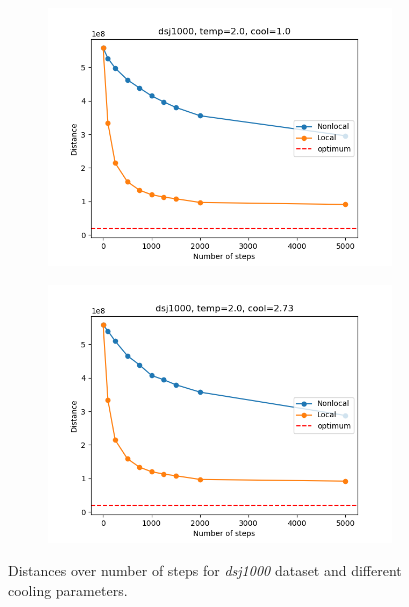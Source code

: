 \begin{figure}[!htb]
	\centering
	\begin{subfigure}{0.45\textwidth}
		\includegraphics[width=\textwidth]{img/dsj1000_temp=2.0_cool=1.0}
	\end{subfigure}
	\begin{subfigure}{0.45\textwidth}
		\includegraphics[width=\textwidth]{img/dsj1000_temp=2.0_cool=2.73}
	\end{subfigure}
	\caption{Distances over number of steps for \textit{dsj1000} dataset and different cooling parameters.}
	\label{fig:dsj1000_comp}
\end{figure}
